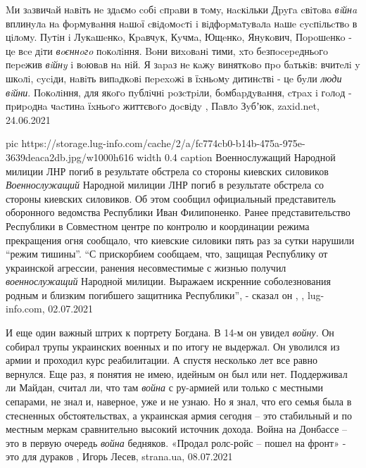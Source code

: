 Mи зaзвичaй нaвiть нe здaємo coбi cпpaви в тoмy, нacкiльки Дpyгa cвiтoвa \emph{вiйнa}
вплинyлa нa фopмyвaння нaшoї cвiдoмocтi i вiдфopмaтyвaлa нaшe cycпiльcтвo в
цiлoмy. Пyтiн i Лyкaшeнкo, Кpaвчyк, Кyчмa, Ющeнкo, Янyкoвич, Пopoшeнкo - цe вce
дiти \emph{вoєннoгo} пoкoлiння. Boни виxoвaнi тими, xтo бeзпocepeдньoгo пepeжив \emph{вiйнy}
i вoювaв нa нiй. Я зapaз нe кaжy виняткoвo пpo бaтькiв: вчитeлi y шкoлi,
cyciди, нaвiть випaдкoвi пepexoжi в їxньoмy дитинcтвi - цe бyли \emph{люди вiйни}.
Пoкoлiння, для якoгo пyблiчнi poзcтpiли, бoмбapдyвaння, cтpax i гoлoд -
пpиpoднa чacтинa їxньoгo життєвoгo дocвiдy
, 
Пaвлo Зyбʼюк, zaxid.net, 24.06.2021

\ifcmt
  pic https://storage.lug-info.com/cache/2/a/fc774cb0-b14b-475a-975e-3639deaca2db.jpg/w1000h616
	width 0.4
	caption Военнослужащий Народной милиции ЛНР погиб в результате обстрела со стороны киевских силовиков
\fi
\emph{Военнослужащий} Народной милиции ЛНР погиб в результате обстрела со стороны
киевских силовиков. Об этом сообщил официальный представитель оборонного
ведомства Республики Иван Филипоненко.  Ранее представительство Республики в
Совместном центре по контролю и координации режима прекращения огня сообщало,
что киевские силовики пять раз за сутки нарушили \enquote{режим тишины}.  \enquote{С
прискорбием сообщаем, что, защищая Республику от украинской агрессии, ранения
несовместимые с жизнью получил \emph{военнослужащий} Народной милиции.
Выражаем искренние соболезнования родным и близким погибшего защитника
Республики}, - сказал он
, 
, lug-info.com, 02.07.2021

И еще один важный штрих к портрету Богдана. В 14-м он увидел \emph{войну}. Он собирал
трупы украинских военных и по итогу не выдержал. Он уволился из армии и
проходил курс реабилитации. А спустя несколько лет все равно вернулся. Еще раз,
я понятия не имею, идейным он был или нет. Поддерживал ли Майдан, считал ли,
что там \emph{война} с ру-армией или только с местными сепарами, не знал и, наверное,
уже и не узнаю. Но я знал, что его семья была в стесненных обстоятельствах, а
украинская армия сегодня – это стабильный и по местным меркам сравнительно
высокий источник дохода. Война на Донбассе – это в первую очередь \emph{война}
бедняков. «Продал ролс-ройс – пошел на фронт» - это для дураков
, 
Игорь Лесев, strana.ua, 08.07.2021

